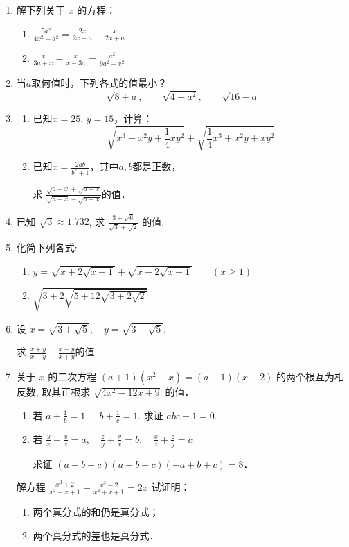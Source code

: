\begin{enumerate}
\item 解下列关于 $x$ 的方程：
\begin{enumerate}
\item $\frac{5 a^{2}}{4 x^{2}-a^{2}}=\frac{2 x}{2 x-a}-\frac{x}{2 x+a}$
\item $\frac{x}{3 a+x}-\frac{x}{x-3 a}=\frac{a^{2}}{9 a^{2}-x^{2}}$
\end{enumerate}

\item 当$a$取何值时，下列各式的值最小？
\[\sqrt{8+a},\qquad \sqrt{4-a^2},\qquad \sqrt{16-a}  \]

\item \begin{enumerate}
    \item 已知$x=25$, $y=15$，计算：
    \[\sqrt{x^3+x^2y+\frac{1}{4}xy^2}+\sqrt{\frac{1}{4}x^3+x^2y+xy^2} \]
    \item 已知$x=\frac{2ab}{b^2+1}$，其中$a,b$都是正数，
    
    求 $\frac{\sqrt{a+x}+\sqrt{a-x}}{\sqrt{a+x}-\sqrt{a-x}}$的值．
\end{enumerate}

\item 已知 $\sqrt{3} \approx 1.732$, 求 $\frac{3+\sqrt{6}}{\sqrt{3}+\sqrt{2}}$ 的值.
\item 化简下列各式:
\begin{enumerate}
    \item $y=\sqrt{x+2 \sqrt{x-1}}+\sqrt{x-2 \sqrt{x-1}}\qquad (x \geqslant 1)$
    \item $\sqrt{3+2 \sqrt{5+12 \sqrt{3+2 \sqrt{2}}}}$
\end{enumerate}

\item 设 $x=\sqrt{3+\sqrt{5}},\quad  y=\sqrt{3-\sqrt{5}}$,

求 $\frac{x+y}{x-y}-\frac{x-y}{x+y}$的值.
\item 关于 $x$ 的二次方程 $(a+1)\left(x^{2}-x\right)=(a-1)(x-2)$
的两个根互为相反数, 取其正根求 $\sqrt{4 x^{2}-12 x+9}$ 的值．
\staritem
\begin{enumerate}
    \item 若 $a+\frac{1}{b}=1, \quad b+\frac{1}{c}=1$. 求证 $a b c+1=0$.
    \item 若 $\frac{y}{x}+\frac{x}{z}=a,\quad  \frac{z}{y}+\frac{y}{x}=b,\quad  \frac{x}{z}+\frac{z}{y}=c$
    
求证 $(a+b-c)(a-b+c)(-a+b+c)=8$．
\end{enumerate}


\staritem 解方程 $\frac{x^{3}+2}{x^{2}-x+1}+\frac{x^{3}-2}{x^{2}+x+1}=2 x$
\staritem 试证明：
\begin{enumerate}
    \item 两个真分式的和仍是真分式；
    \item 两个真分式的差也是真分式．
\end{enumerate}

\end{enumerate}

